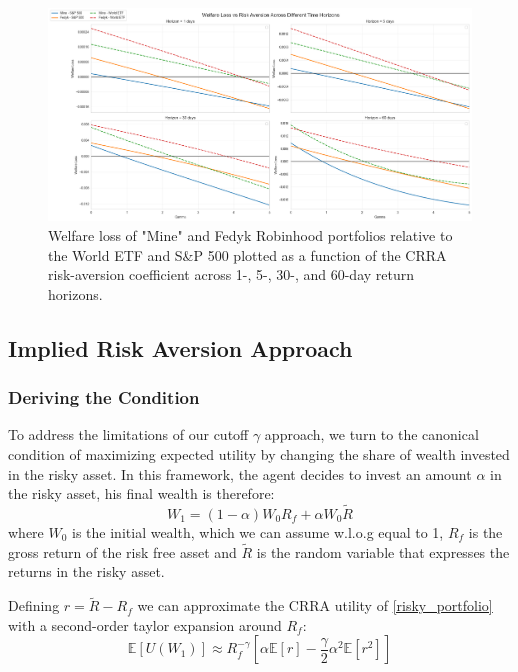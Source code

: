\begin{figure}[H]
    \centering
    \includegraphics[width=\linewidth]{../images/wl_mkt.png}
\caption{Welfare loss of "Mine" and Fedyk Robinhood portfolios relative to the World ETF and S\&P 500 plotted as a function of the CRRA risk-aversion coefficient across 1-, 5-, 30-, and 60-day return horizons.}
\label{fig:wl_mkt}
\end{figure}    



\subsection{Implied Risk Aversion Approach}
\subsubsection{Deriving the Condition}
To address the limitations of our cutoff $\gamma$ approach, we turn to the canonical condition of maximizing expected utility by changing the share of wealth invested in the risky asset.  
In this framework, the agent decides to invest an amount $\alpha$ in the risky asset, his final wealth is therefore:
\begin{equation}
    W_1 = (1-\alpha) W_0 R_f  + \alpha W_0 \tilde R 
    \label{risky_portfolio}
\end{equation}
where $W_0$ is the initial wealth, which we can assume w.l.o.g equal to 1, $R_f$ is the gross return of the risk free asset and $\tilde R$ is the random variable that expresses the returns in the risky asset.

Defining $r=\tilde R - R_f$ we can approximate the CRRA utility of \ref{risky_portfolio} with a second-order taylor expansion around $R_f$:
\begin{equation}
    \mathbb{E}[U(W_1)] \approx R_f^{-\gamma} [\alpha \mathbb{E}[r] - \frac{\gamma}{2}\alpha^2\mathbb{E}[r^2]]
\end{equation} 

